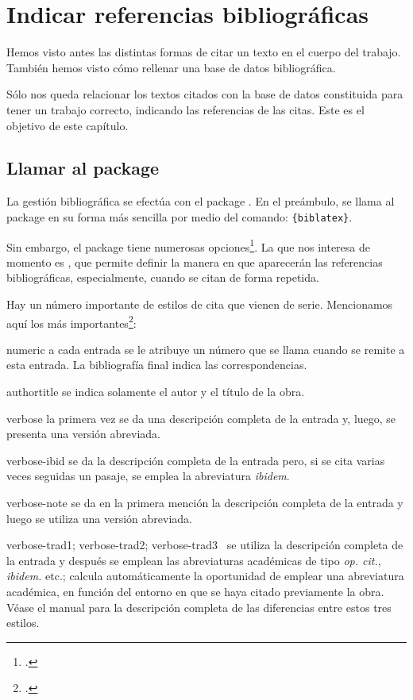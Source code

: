 \chapter{Indicar referencias bibliográficas}

\bibverbose

\begin{intro}
Hemos visto antes las distintas formas de citar un
texto en el cuerpo del trabajo. También hemos visto
cómo rellenar una base de datos bibliográfica.

Sólo nos queda relacionar los textos citados con la base de datos
constituida para tener un trabajo correcto, indicando las referencias
de las citas. Este es el objetivo de este capítulo.

\end{intro}


\section[Llamar al  package]{Llamar al package }

La gestión bibliográfica se efectúa con el  package
. En el preámbulo, se llama al package en su forma
más sencilla por medio del comando:
\verb|{biblatex}|.


Sin embargo, el  package tiene numerosas
opciones\footcite{biblatex_options}. La que nos interesa de momento es
, que permite definir la manera en que aparecerán
las referencias bibliográficas,  especialmente, cuando se citan de
forma repetida.

Hay un número importante de estilos de cita que vienen de
serie. Mencionamos aquí los más importantes\footcite[Para más
detalles, véase][]{biblatex_style}:
\begin{choix}
\item[numeric]a cada entrada se le atribuye un número que se llama
  cuando se remite a esta entrada. La bibliografía final indica las correspondencias.
\item[authortitle]se indica solamente el autor y el título de la obra.
\item[verbose]la primera vez se da una descripción completa de la
  entrada y, luego, se presenta una versión abreviada.
\item[verbose-ibid]se da la descripción completa de la entrada pero,
  si se cita varias veces seguidas un pasaje, se emplea la abreviatura \emph{ibidem}.
\item[verbose-note]se da en la primera mención la descripción completa
  de la entrada y luego se utiliza una versión abreviada.
\item[verbose-trad1; verbose-trad2; verbose-trad3]~se utiliza la
  descripción completa de la entrada y después se emplean las abreviaturas
  académicas de tipo \emph{op. cit.}, \emph{ibidem.} etc.;
   calcula automáticamente la oportunidad de emplear
  una abreviatura académica, en función del entorno en que se haya
  citado previamente la obra. Véase el manual para la descripción
  completa de las diferencias entre estos tres estilos.
\end{choix}

